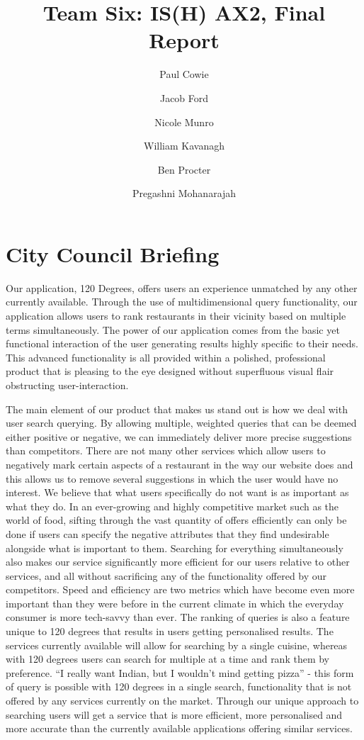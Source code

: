 \documentclass[10pt,a4paper]{article}
\author{Paul Cowie \and Jacob Ford \and Nicole Munro \and William Kavanagh \and Ben Procter \and Pregashni Mohanarajah }
\date{}
\title{Team Six: IS(H) AX2, Final Report}
\begin{document}
\maketitle

\section*{City Council Briefing}

Our application, 120 Degrees, offers users an experience unmatched by any other currently available. Through the use of multidimensional query functionality, our application allows users to rank restaurants in their vicinity based on multiple terms simultaneously. The power of our application comes from the basic yet functional interaction of the user generating results highly specific to their needs. This advanced functionality is all provided within a polished, professional product that is pleasing to the eye designed without superfluous visual flair obstructing user-interaction.

The main element of our product that makes us stand out is how we deal with user search querying. By allowing multiple, weighted queries that can be deemed either positive or negative, we can immediately deliver more precise suggestions than competitors. There are not many other services which allow users to negatively mark certain aspects of a restaurant in the way our website does and this allows us to remove several suggestions in which the user would have no interest. We believe that what users specifically do not want is as important as what they do. In an ever-growing and highly competitive market such as the world of food, sifting through the vast quantity of offers efficiently can only be done if users can specify the negative attributes that they find undesirable alongside what is important to them. Searching for everything simultaneously also makes our service significantly more efficient for our users relative to other services, and all without sacrificing any of the functionality offered by our competitors. Speed and efficiency are two metrics which have become even more important than they were before in the current climate in which the everyday consumer is more tech-savvy than ever. The ranking of queries is also a feature unique to 120 degrees that results in users getting personalised results. The services currently available will allow for searching by a single cuisine, whereas with 120 degrees users can search for multiple at a time and rank them by preference. “I really want Indian, but I wouldn’t mind getting pizza” - this form of query is possible with 120 degrees in a single search, functionality that is not offered by any services currently on the market. Through our unique approach to searching users will get a service that is more efficient, more personalised and more accurate than the currently available applications offering similar services.
\end{document}
